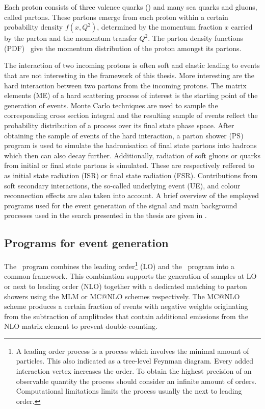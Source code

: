 Each proton consists of three valence quarks (\Pup\Pup\Pdown) and many sea quarks and gluons, called partons. These partons emerge from each proton within a certain probability density $f(x,Q^2)$, determined by the momentum fraction $x$ carried by the parton and the momentum transfer $Q^2$. The parton density functions (PDF)~\cite{Placakyte:2011az} give the momentum distribution of the proton amongst its partons.

The interaction of two incoming protons is often soft and elastic leading to events that are not interesting in the framework of this thesis. More interesting are the hard interaction between two partons from the incoming protons. The matrix elements (ME) of a hard scattering process of interest is the starting point of the generation of events. Monte Carlo techniques are used to sample the corresponding cross section integral and the resulting sample of events reflect the probability distribution of a process over its final state phase space. After obtaining the sample of events of the hard interaction, a parton shower (PS) program is used to simulate the hadronisation of final state partons into hadrons which then can also decay further. Additionally, radiation of soft gluons or quarks from initial or final state partons is simulated. These are respectively reffered to as initial state radiation (ISR) or final state radiation (FSR). Contributions from soft secondary interactions, the so-called underlying event (UE), and colour reconnection effects are also taken into account. 
A brief overview of the employed programs used for the event generation of the signal and main background processes used in the search presented in the thesis are given in .

\subsection{Programs for event generation}
\label{sec:programs}

The \aMCMG\ program combines the leading order\footnote{A leading order process is a process which involves the minimal amount of particles. This also indicated as a tree-level Feynman diagram. Every added interaction vertex increases the order. To obtain the highest precision of an observable quantity the process should consider an infinite amount of orders. Computational limitations limits the process usually the next to leading order.} (LO) and the \aMC\ program into a common framework. This combination supports the generation of samples at LO or next to leading order (NLO) together with a dedicated matching to parton showers  using the MLM or MC$@$NLO schemes respectively. The MC$@$NLO scheme produces a certain fraction of events with negative weights originating from the subtraction of amplitudes that contain additional emissions from the NLO matrix element to prevent double-counting.


